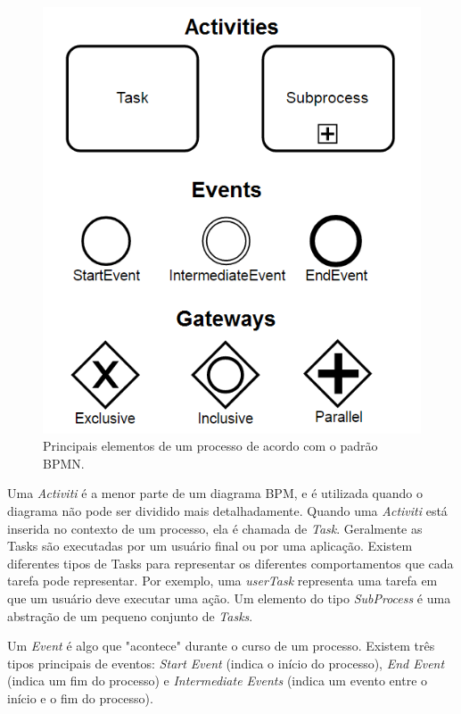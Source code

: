 \documentclass[12pt]{article}
\begin{document}

\begin{figure}[ht]
\centering
\includegraphics[width=.8\textwidth]{figuras/bpmn.png}
\caption{Principais elementos de um processo de acordo com o padrão BPMN.}
\label{fig:bpmn}
\end{figure}

Uma \emph{Activiti} é a menor parte de um diagrama BPM, e é utilizada quando o diagrama não pode ser dividido mais detalhadamente. Quando uma \emph{Activiti} está inserida no contexto de um processo, ela é chamada de \emph{Task}. Geralmente as Tasks são executadas por um usuário final ou por uma aplicação. Existem diferentes tipos de Tasks para representar os diferentes comportamentos que cada tarefa pode representar. Por exemplo, uma \emph{userTask} representa uma tarefa em que um usuário deve executar uma ação. Um elemento do tipo \emph{SubProcess} é uma abstração de um pequeno conjunto de \emph{Tasks}.

Um \emph{Event} é algo que "acontece" durante o curso de um processo\cite{model2011notation}. Existem três tipos principais de eventos: \emph{Start Event} (indica o início do processo), \emph{End Event} (indica um fim do processo) e \emph{Intermediate Events} (indica um evento entre o início e o fim do processo).
\end{document}
